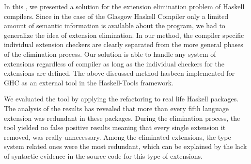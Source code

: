 \documentclass[main.tex]{subfiles}
\begin{document}
	
	In this \paper{}, we presented a solution for the extension elimination problem of Haskell compilers. Since in the case of the Glasgow Haskell Compiler only a limited amount of semantic information is available about the program, we had to generalize the idea of extension elimination. In our method, the compiler specific individual extension checkers are clearly separated from the more general phases of the elimination process. Our solution is able to handle any system of extensions regardless of compiler as long as the individual checkers for the extensions are defined. The above discussed method hasbeen implemented for GHC as an external tool in the Haskell-Tools framework.
	
	We evaluated the tool by applying the refactoring to real life Haskell packages. The analysis of the results has revealed that more than every fifth language extension was redundant in these packages. During the elimination process, the tool yielded no false positive results meaning that every single extension it removed, was really unnecessary. Among the eliminated extensions, the type system related ones were the most redundant, which can be explained by the lack of syntactic evidence in the source code for this type of extensions.
	
\end{document}
